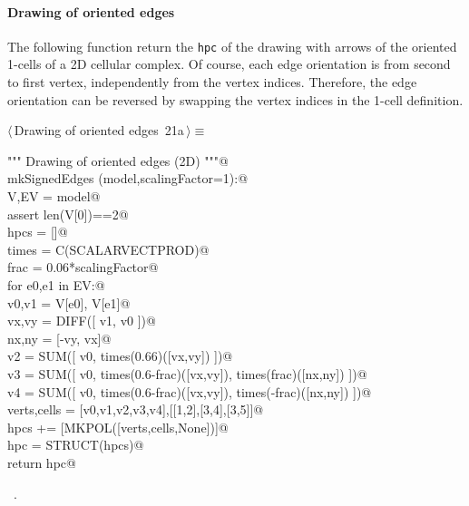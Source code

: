 \documentclass[11pt,oneside]{article}    %
\begin{document}
\paragraph{Drawing of oriented edges}
The following function return the \texttt{hpc} of the drawing with arrows of the oriented 1-cells of a 2D cellular complex. Of course, each edge orientation is from second to first vertex, independently from the vertex indices. Therefore, the edge orientation can be reversed by swapping the vertex indices in the 1-cell definition. 
\begin{flushleft} \small \label{scrap34}
\protect{}$\langle\,$Drawing of oriented edges\nobreak\ {\footnotesize 21a}$\,\rangle\equiv$
\vspace{-1ex}
\begin{list}{}{} \item
\mbox{}\verb@""" Drawing of oriented edges (2D) """@\\
\mbox{}\verb@def mkSignedEdges (model,scalingFactor=1):@\\
\mbox{}\verb@    V,EV = model@\\
\mbox{}\verb@    assert len(V[0])==2@\\
\mbox{}\verb@    hpcs = []@\\
\mbox{}\verb@    times = C(SCALARVECTPROD)@\\
\mbox{}\verb@    frac = 0.06*scalingFactor@\\
\mbox{}\verb@    for e0,e1 in EV:@\\
\mbox{}\verb@        v0,v1 = V[e0], V[e1]@\\
\mbox{}\verb@        vx,vy = DIFF([ v1, v0 ])@\\
\mbox{}\verb@        nx,ny = [-vy, vx]@\\
\mbox{}\verb@        v2 = SUM([ v0, times(0.66)([vx,vy]) ])@\\
\mbox{}\verb@        v3 = SUM([ v0, times(0.6-frac)([vx,vy]), times(frac)([nx,ny]) ])@\\
\mbox{}\verb@        v4 = SUM([ v0, times(0.6-frac)([vx,vy]), times(-frac)([nx,ny]) ])@\\
\mbox{}\verb@        verts,cells = [v0,v1,v2,v3,v4],[[1,2],[3,4],[3,5]]@\\
\mbox{}\verb@        hpcs += [MKPOL([verts,cells,None])]@\\
\mbox{}\verb@    hpc = STRUCT(hpcs)@\\
\mbox{}\verb@    return hpc@\\
\mbox{}\verb@@{\NWsep}
\end{list}
\vspace{-1ex}
\footnotesize\addtolength{\baselineskip}{-1ex}
\begin{list}{}{\setlength{\itemsep}{-\parsep}\setlength{\itemindent}{-\leftmargin}}
\item \NWtxtMacroRefIn\ .
\end{list}
\end{flushleft}
\end{document}
